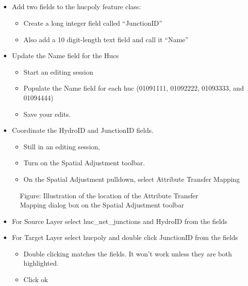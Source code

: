 \documentclass[letterpaper,10pt,english]{sphinxmanual}
\begin{document}
\subparagraph{}
\label{\detokenize{ex_2:connect-local-folder-streams}}\begin{itemize}
\item {} 
Add two fields to the hucpoly feature class:
\begin{itemize}
\item {} 
Create a long integer field called “JunctionID”

\item {} 
Also add a 10 digit-length text field and call it “Name”

\end{itemize}

\item {} 
Update the Name field for the Hucs
\begin{itemize}
\item {} 
Start an editing session

\item {} 
Populate the Name field for each huc (01091111, 01092222, 01093333, and 01094444)

\item {} 
Save your edits.

\end{itemize}

\item {} 
Coordinate the HydroID and JunctionID fields.
\begin{itemize}
\item {} 
Still in an editing session,

\item {} 
Turn on the Spatial Adjustment toolbar.

\item {} 
On the Spatial Adjustment pulldown, select Attribute Transfer Mapping

\end{itemize}

\end{itemize}

\begin{figure}[htbp]
\centering
\capstart

\noindent{}
\caption{Figure: Illustration of the location of the Attribute Transfer Mapping dialog box on the Spatial Adjustment toolbar}\label{\detokenize{ex_2:id33}}\end{figure}
\begin{itemize}
\item {} 
For Source Layer select huc\_net\_junctions and HydroID from the fields

\item {} 
For Target Layer select hucpoly and double click JunctionID from the fields
\begin{itemize}
\item {} 
Double clicking matches the fields. It won’t work unless they are both highlighted.

\item {} 
Click ok

\end{itemize}

\end{itemize}
\end{document}
